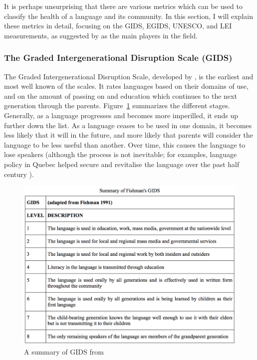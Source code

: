 It is perhaps unsurprising that there are various metrics which can be used to classify the health of a language and its community. In this section, I will explain these metrics in detail, focusing on the GIDS, EGIDS, UNESCO, and LEI measurements, as suggested by \citet{yang2017toward} as the main players in the field.

\subsubsection{The Graded Intergenerational Disruption Scale (GIDS)}

The Graded Intergenerational Disruption Scale, developed by \citet{fishman1991reversing}, is the earliest and most well known of the scales. It rates languages based on their domains of use, and on the amount of passing on and education which continues to the next generation through the parents. Figure~\ref{fig:gids} summarizes the different stages. Generally, as a language progresses and becomes more imperilled, it ends up further down the list. As a language ceases to be used in one domain, it becomes less likely that it will in the future, and more likely that parents will consider the language to be less useful than another. Over time, this causes the language to lose speakers (although the process is not inevitable; for examples, language policy in Quebec helped secure and revitalise the language over the past half century \citep{bourhis2001reversing}).

\begin{figure}
 \centering
 \includegraphics[width=.8\textwidth]{img/gids.png}
 \caption{A summary of GIDS from \citep[105]{lewis2010assessing}}
 \label{fig:gids}
\end{figure}

